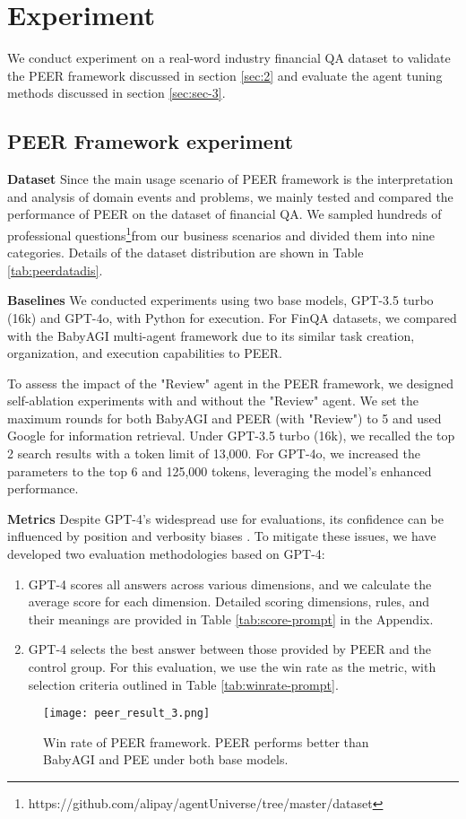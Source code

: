 \documentclass[11pt]{article}
\begin{document}
\section{Experiment}
We conduct experiment on a real-word industry financial QA dataset to validate the PEER framework discussed in section \ref{sec:2} and evaluate the agent tuning methods discussed in section \ref{sec:sec-3}.

\subsection{PEER Framework experiment}
\label{sec:tuning-exp}
\textbf{Dataset}
Since the main usage scenario of PEER framework is the interpretation and analysis of domain events and problems, we mainly tested and compared the performance of PEER on the dataset of financial QA. We sampled hundreds of professional questions\footnote{https://github.com/alipay/agentUniverse/tree/master/dataset}from our business scenarios and divided them into nine categories. Details of the dataset distribution are shown in Table \ref{tab:peerdatadis}.

\textbf{Baselines}
We conducted experiments using two base models, GPT-3.5 turbo (16k) and GPT-4o, with Python for execution. For FinQA datasets, we compared with the BabyAGI multi-agent framework due to its similar task creation, organization, and execution capabilities to PEER.

To assess the impact of the "Review" agent in the PEER framework, we designed self-ablation experiments with and without the "Review" agent. We set the maximum rounds for both BabyAGI and PEER (with "Review") to 5 and used Google for information retrieval. Under GPT-3.5 turbo (16k), we recalled the top 2 search results with a token limit of 13,000. For GPT-4o, we increased the parameters to the top 6 and 125,000 tokens, leveraging the model's enhanced performance.

\textbf{Metrics}
Despite GPT-4’s widespread use for evaluations, its confidence can be influenced by position and verbosity biases \cite{guo-direct,llm-as-a-judge}. To mitigate these issues, we have developed two evaluation methodologies based on GPT-4:
\begin{enumerate}
    \item GPT-4 scores all answers across various dimensions, and we calculate the average score for each dimension. Detailed scoring dimensions, rules, and their meanings are provided in Table \ref{tab:score-prompt} in the Appendix.
    \item GPT-4 selects the best answer between those provided by PEER and the control group. For this evaluation, we use the win rate as the metric, with selection criteria outlined in Table \ref{tab:winrate-prompt}.
\end{enumerate}
\begin{figure*}[htbp]
    \centering
    \texttt{[image: peer\_result\_3.png]}
    \caption{Win rate of PEER framework. PEER performs better than BabyAGI and PEE under both base models.}
    \label{fig:your_label3}
\end{figure*}
\end{document}

